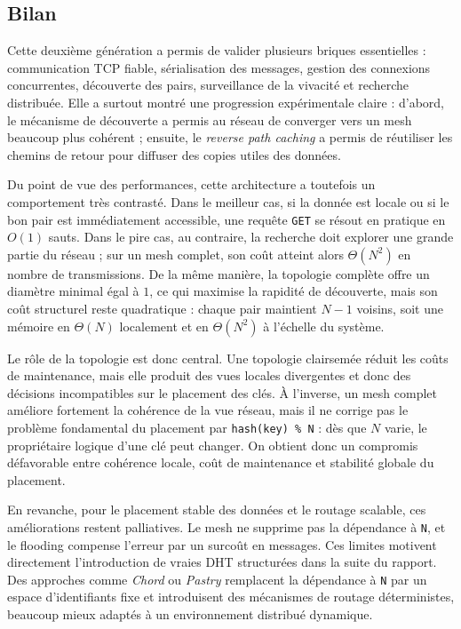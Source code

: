 \subsection{Bilan}

Cette deuxième génération a permis de valider plusieurs briques essentielles : communication TCP fiable, sérialisation des messages, gestion des connexions concurrentes, découverte des pairs, surveillance de la vivacité et recherche distribuée. Elle a surtout montré une progression expérimentale claire : d'abord, le mécanisme de découverte a permis au réseau de converger vers un mesh beaucoup plus cohérent ; ensuite, le \textit{reverse path caching} a permis de réutiliser les chemins de retour pour diffuser des copies utiles des données.

Du point de vue des performances, cette architecture a toutefois un comportement très contrasté. Dans le meilleur cas, si la donnée est locale ou si le bon pair est immédiatement accessible, une requête \texttt{GET} se résout en pratique en \(O(1)\) sauts. Dans le pire cas, au contraire, la recherche doit explorer une grande partie du réseau ; sur un mesh complet, son coût atteint alors \(\Theta(N^2)\) en nombre de transmissions. De la même manière, la topologie complète offre un diamètre minimal égal à \(1\), ce qui maximise la rapidité de découverte, mais son coût structurel reste quadratique : chaque pair maintient \(N-1\) voisins, soit une mémoire en \(\Theta(N)\) localement et en \(\Theta(N^2)\) à l'échelle du système.

Le rôle de la topologie est donc central. Une topologie clairsemée réduit les coûts de maintenance, mais elle produit des vues locales divergentes et donc des décisions incompatibles sur le placement des clés. À l'inverse, un mesh complet améliore fortement la cohérence de la vue réseau, mais il ne corrige pas le problème fondamental du placement par \texttt{hash(key) \% N} : dès que \(N\) varie, le propriétaire logique d'une clé peut changer. On obtient donc un compromis défavorable entre cohérence locale, coût de maintenance et stabilité globale du placement.

En revanche, pour le placement stable des données et le routage scalable, ces améliorations restent palliatives. Le mesh ne supprime pas la dépendance à \texttt{N}, et le flooding compense l'erreur par un surcoût en messages. Ces limites motivent directement l'introduction de vraies DHT structurées dans la suite du rapport. Des approches comme \textit{Chord} ou \textit{Pastry} remplacent la dépendance à \texttt{N} par un espace d'identifiants fixe et introduisent des mécanismes de routage déterministes, beaucoup mieux adaptés à un environnement distribué dynamique.